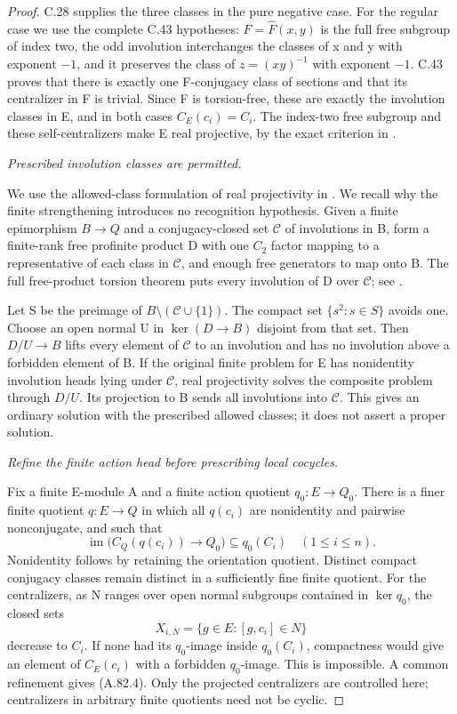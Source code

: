 \begin{proof}
C.28 supplies the three classes in the pure negative case.
For the regular case we use the complete C.43 hypotheses:
\(F=\widehat F(x,y)\) is the full free subgroup of index
two, the odd involution interchanges the classes of x and y
with exponent \(-1\), and it preserves the class of
\(z=(xy)^{-1}\) with exponent \(-1\). C.43 proves
that there is exactly one F-conjugacy class of sections
and that its centralizer in F is trivial. Since F is
torsion-free, these are exactly the involution classes
in E, and in both cases \(C_E(c_i)=C_i\).
The index-two free subgroup and these self-centralizers
make E real projective, by the exact criterion in
\citet[Theorem~2.1]{A_PalQuickFormal2025}.

\emph{Prescribed involution classes are permitted.}\par
We use the allowed-class formulation of real projectivity in
\citet[Definition~1.1(4), Remark~1.2(b), and Proposition~2.3]{AHaran1990}.
We recall why the finite strengthening introduces no recognition
hypothesis. Given a finite epimorphism \(B\to Q\) and
a conjugacy-closed set \(\mathcal C\) of involutions in B,
form a finite-rank free profinite product D with one \(C_2\)
factor mapping to a representative of each class in
\(\mathcal C\), and enough free generators to map onto B.
The full free-product torsion theorem puts every involution
of D over \(\mathcal C\); see
\citet[Theorem~A']{A_HR1985}.

Let S be the preimage of \(B\setminus(\mathcal C\cup\{1\})\).
The compact set \(\{s^2:s\in S\}\) avoids one. Choose
an open normal U in \(\ker(D\to B)\) disjoint from that
set. Then \(D/U\to B\) lifts every element of
\(\mathcal C\) to an involution and has no involution
above a forbidden element of B. If the original finite
problem for E has nonidentity involution heads lying under
\(\mathcal C\), real projectivity solves the composite
problem through \(D/U\). Its projection to B sends all
involutions into \(\mathcal C\). This gives an ordinary
solution with the prescribed allowed classes; it does not
assert a proper solution.

\emph{Refine the finite action head before prescribing local
cocycles.}\par
Fix a finite E-module A and a finite action quotient
\(q_0:E\to Q_0\). There is a finer finite quotient
\(q:E\to Q\) in which all \(q(c_i)\) are nonidentity
and pairwise nonconjugate, and such that
\[
 \operatorname{im}\bigl(C_Q(q(c_i))\longrightarrow Q_0\bigr)
                         \subseteq q_0(C_i)
                 \quad(1\le i\le n).
 \tag{A.82.4}
\]
Nonidentity follows by retaining the orientation quotient.
Distinct compact conjugacy classes remain distinct in a
sufficiently fine finite quotient. For the centralizers,
as N ranges over open normal subgroups contained in
\(\ker q_0\), the closed sets
\[
                  X_{i,N}=\{g\in E:[g,c_i]\in N\}
\]
decrease to \(C_i\). If none had its \(q_0\)-image
inside \(q_0(C_i)\), compactness would give an element
of \(C_E(c_i)\) with a forbidden \(q_0\)-image.
This is impossible. A common refinement gives (A.82.4).
Only the projected centralizers are controlled here;
centralizers in arbitrary finite quotients need not be cyclic.


\end{proof}

